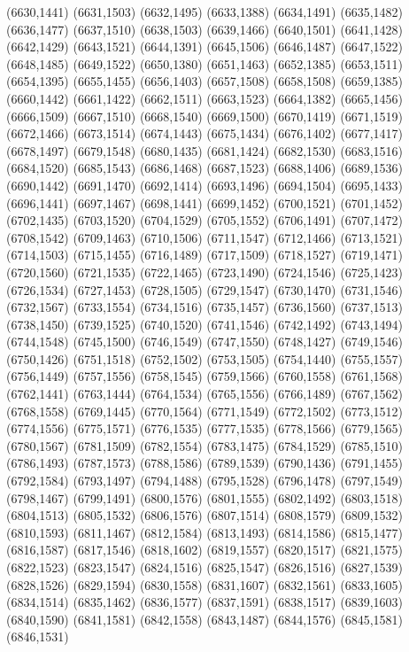 (6630,1441)
(6631,1503)
(6632,1495)
(6633,1388)
(6634,1491)
(6635,1482)
(6636,1477)
(6637,1510)
(6638,1503)
(6639,1466)
(6640,1501)
(6641,1428)
(6642,1429)
(6643,1521)
(6644,1391)
(6645,1506)
(6646,1487)
(6647,1522)
(6648,1485)
(6649,1522)
(6650,1380)
(6651,1463)
(6652,1385)
(6653,1511)
(6654,1395)
(6655,1455)
(6656,1403)
(6657,1508)
(6658,1508)
(6659,1385)
(6660,1442)
(6661,1422)
(6662,1511)
(6663,1523)
(6664,1382)
(6665,1456)
(6666,1509)
(6667,1510)
(6668,1540)
(6669,1500)
(6670,1419)
(6671,1519)
(6672,1466)
(6673,1514)
(6674,1443)
(6675,1434)
(6676,1402)
(6677,1417)
(6678,1497)
(6679,1548)
(6680,1435)
(6681,1424)
(6682,1530)
(6683,1516)
(6684,1520)
(6685,1543)
(6686,1468)
(6687,1523)
(6688,1406)
(6689,1536)
(6690,1442)
(6691,1470)
(6692,1414)
(6693,1496)
(6694,1504)
(6695,1433)
(6696,1441)
(6697,1467)
(6698,1441)
(6699,1452)
(6700,1521)
(6701,1452)
(6702,1435)
(6703,1520)
(6704,1529)
(6705,1552)
(6706,1491)
(6707,1472)
(6708,1542)
(6709,1463)
(6710,1506)
(6711,1547)
(6712,1466)
(6713,1521)
(6714,1503)
(6715,1455)
(6716,1489)
(6717,1509)
(6718,1527)
(6719,1471)
(6720,1560)
(6721,1535)
(6722,1465)
(6723,1490)
(6724,1546)
(6725,1423)
(6726,1534)
(6727,1453)
(6728,1505)
(6729,1547)
(6730,1470)
(6731,1546)
(6732,1567)
(6733,1554)
(6734,1516)
(6735,1457)
(6736,1560)
(6737,1513)
(6738,1450)
(6739,1525)
(6740,1520)
(6741,1546)
(6742,1492)
(6743,1494)
(6744,1548)
(6745,1500)
(6746,1549)
(6747,1550)
(6748,1427)
(6749,1546)
(6750,1426)
(6751,1518)
(6752,1502)
(6753,1505)
(6754,1440)
(6755,1557)
(6756,1449)
(6757,1556)
(6758,1545)
(6759,1566)
(6760,1558)
(6761,1568)
(6762,1441)
(6763,1444)
(6764,1534)
(6765,1556)
(6766,1489)
(6767,1562)
(6768,1558)
(6769,1445)
(6770,1564)
(6771,1549)
(6772,1502)
(6773,1512)
(6774,1556)
(6775,1571)
(6776,1535)
(6777,1535)
(6778,1566)
(6779,1565)
(6780,1567)
(6781,1509)
(6782,1554)
(6783,1475)
(6784,1529)
(6785,1510)
(6786,1493)
(6787,1573)
(6788,1586)
(6789,1539)
(6790,1436)
(6791,1455)
(6792,1584)
(6793,1497)
(6794,1488)
(6795,1528)
(6796,1478)
(6797,1549)
(6798,1467)
(6799,1491)
(6800,1576)
(6801,1555)
(6802,1492)
(6803,1518)
(6804,1513)
(6805,1532)
(6806,1576)
(6807,1514)
(6808,1579)
(6809,1532)
(6810,1593)
(6811,1467)
(6812,1584)
(6813,1493)
(6814,1586)
(6815,1477)
(6816,1587)
(6817,1546)
(6818,1602)
(6819,1557)
(6820,1517)
(6821,1575)
(6822,1523)
(6823,1547)
(6824,1516)
(6825,1547)
(6826,1516)
(6827,1539)
(6828,1526)
(6829,1594)
(6830,1558)
(6831,1607)
(6832,1561)
(6833,1605)
(6834,1514)
(6835,1462)
(6836,1577)
(6837,1591)
(6838,1517)
(6839,1603)
(6840,1590)
(6841,1581)
(6842,1558)
(6843,1487)
(6844,1576)
(6845,1581)
(6846,1531)
